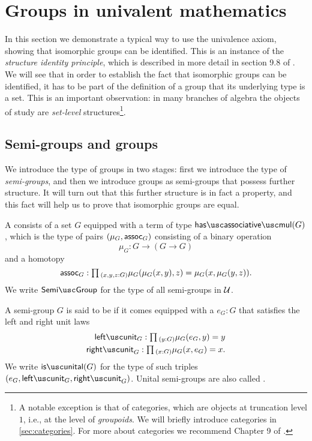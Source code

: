 \section{Groups in univalent mathematics}

In this section we demonstrate a typical way to use the univalence axiom, showing that isomorphic groups can be identified.
This is an instance of the \emph{structure identity principle}, which is described in more detail in section 9.8 of \cite{hottbook}.
We will see that in order to establish the fact that isomorphic groups can be identified, it has to be part of the definition of a group that its underlying type is a set. This is an important observation: in many branches of algebra the objects of study are \emph{set-level} structures\footnote{A notable exception is that of categories, which are objects at truncation level $1$, i.e., at the level of \emph{groupoids}. We will briefly introduce categories in \cref{sec:categories}. For more about categories we recommend Chapter 9 of \cite{hottbook}.}.

\subsection{Semi-groups and groups}
We introduce the type of groups in two stages: first we introduce the type of \emph{semi-groups}, and then we introduce groups as semi-groups that possess further structure. It will turn out that this further structure is in fact a property, and this fact will help us to prove that isomorphic groups are equal.

\begin{defn}
  A  consists of a set $G$ equipped with a term of type $\hasassociativemul(G)$, which is the type of pairs $(\mu_G,\mathsf{assoc}_G)$ consisting of a binary operation
  \begin{equation*}
    \mu_G : G \to (G \to G)
  \end{equation*}
  and a homotopy
  \begin{equation*}
    \assoc_G : \prd{x,y,z:G}\mu_G(\mu_G(x,y),z)=\mu_G(x,\mu_G(y,z)).
  \end{equation*}
  We write $\semigroup$ for the type of all semi-groups in $\mathcal{U}$.
\end{defn}

\begin{defn}
  A semi-group $G$ is said to be  if it comes equipped with a  $e_G:G$ that satisfies the left and right unit laws
  \begin{align*}
    \leftunit_G : \prd{y:G}\mu_G(e_G,y)=y \\
    \rightunit_G : \prd{x:G}\mu_G(x,e_G)=x.
  \end{align*}
  We write $\isunital(G)$ for the type of such triples $(e_G,\leftunit_G,\rightunit_G)$. Unital semi-groups are also called .
\end{defn}

